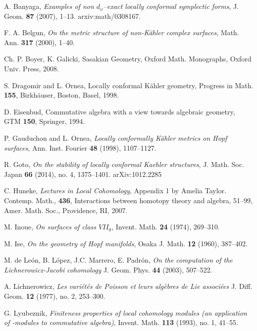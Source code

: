 \documentclass[11pt]{article}
\numberwithin{equation}{section}
\newcommand{\6}{\partial}
\begin{document}
{\scriptsize
\begin{thebibliography}{100}


 A. Banyaga, \emph{Examples of non $d_\omega$--exact
locally
conformal symplectic forms}, J. Geom. {\bf 87} (2007), 1--13.
arxiv:math/0308167.

F. A. Belgun, {\em On the metric structure of
non-K{\"a}hler complex surfaces}, Math. Ann. {\bf 317} (2000),
1--40.

 Ch. P. Boyer, K. Galicki, Sasakian Geometry, Oxford Math. Monographs, Oxford Univ. Press, 2008.

 S.  Dragomir and L.  Ornea,  Locally
conformal
K{\"a}hler
geometry, Progress in Math. {\bf 155},   Birkh{\"a}user, Boston, Basel,
1998.

 D. Eisenbud, Commutative algebra with a view towards algebraic geometry, GTM {\bf 150}, Springer, 1994.

P. Gauduchon and L. Ornea,
{\em Locally conformally K{\"a}hler metrics on Hopf surfaces},
Ann. Inst. Fourier  {\bf 48} (1998), 1107--1127.

R. Goto, \emph{On the stability of locally conformal
  Kaehler structures},   J. Math. Soc. Japan {\bf 66} (2014), no. 4, 1375--1401.  
arXiv:1012.2285


C. Huneke, {\em Lectures in Local Cohomology}, Appendix 1 by Amelia Taylor. Contemp. Math., {\bf 436}, Interactions between homotopy theory and algebra, 51--99, Amer. Math. Soc., Providence, RI, 2007.


 M. Inoue, {\em On surfaces of class $VII_0$}, Invent.
Math. {\bf 24} (1974), 269--310.

 M. Ise, {\em On the geometry of Hopf manifolds}, Osaka J. Math. {\bf 12} (1960), 387--402.




 M. de Le\'on, B. L\'opez, J.C. Marrero, E.
Padr\'on, \emph{On the computation of the Lichnerowicz-Jacobi
cohomology} J. Geom. Phys. {\bf 44} (2003),  507--522.



 A. Lichnerowicz,
{\em Les vari\'et\'es de Poisson et leurs alg\`ebres de Lie associ\'ees}
J. Diff. Geom. {\bf 12} (1977), no. 2, 253--300.

 G. Lyubeznik,  {\em Finiteness properties of local cohomology modules (an application of -modules to commutative algebra)}, Invent. Math. {\bf 113} (1993), no. 1, 41--55.


\end{thebibliography}}
\end{document}
